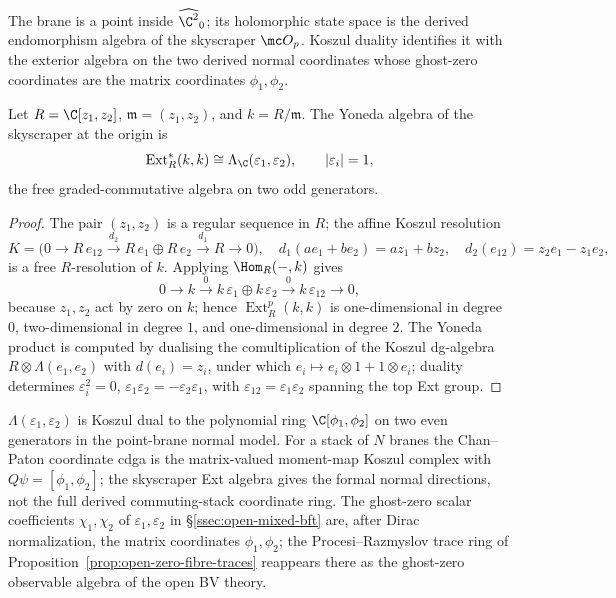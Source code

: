 \documentclass[11pt]{memoir}
\begin{document}
The brane is a point inside \(\widehat{\C^2}_0\); its holomorphic
state space is the derived endomorphism algebra of the skyscraper
\(\mc O_p\). Koszul duality identifies it with the exterior algebra
on the two derived normal coordinates whose ghost-zero coordinates are
the matrix coordinates \(\phi_1,\phi_2\).

\begin{prop}\label{prop:skyscraper-ext}
  Let \(R=\C[z_1,z_2]\), \(\mathfrak m=(z_1,z_2)\), and
  \(k=R/\mathfrak m\). The Yoneda algebra of the skyscraper at the
  origin is
  \[
    \operatorname{Ext}^*_R(k,k)\cong
      \Lambda_{\C}(\varepsilon_1,\varepsilon_2),\qquad
    |\varepsilon_i|=1,
  \]
  the free graded-commutative algebra on two odd generators.
\end{prop}

\begin{proof}
  The pair \((z_1,z_2)\) is a regular sequence in \(R\); the affine
  Koszul resolution
  \[
    K=\bigl(0\to R\,e_{12}\xrightarrow{d_2}
      R\,e_1\oplus R\,e_2\xrightarrow{d_1}R\to0\bigr),\quad
    d_1(ae_1+be_2)=az_1+bz_2,\quad
    d_2(e_{12})=z_2e_1-z_1e_2,
  \]
  is a free \(R\)-resolution of \(k\). Applying \(\Hom_R(-,k)\) gives
  \[
    0\to k\xrightarrow{0}k\,\varepsilon_1\oplus k\,\varepsilon_2
      \xrightarrow{0}k\,\varepsilon_{12}\to 0,
  \]
  because \(z_1,z_2\) act by zero on \(k\); hence
  \(\operatorname{Ext}^p_R(k,k)\) is one-dimensional in degree \(0\),
  two-dimensional in degree \(1\), and one-dimensional in degree
  \(2\). The Yoneda product is computed by dualising the
  comultiplication of the Koszul dg-algebra
  \(R\otimes\Lambda(e_1,e_2)\) with \(d(e_i)=z_i\), under which
  \(e_i\mapsto e_i\otimes1+1\otimes e_i\); duality determines
  \(\varepsilon_i^2=0\),
  \(\varepsilon_1\varepsilon_2=-\varepsilon_2\varepsilon_1\), with
  \(\varepsilon_{12}=\varepsilon_1\varepsilon_2\) spanning the top Ext
  group.
\end{proof}

\begin{rmk}\label{rmk:open-koszul-duality}
  \(\Lambda(\varepsilon_1,\varepsilon_2)\) is Koszul dual to the
  polynomial ring \(\C[\phi_1,\phi_2]\) on two even generators in the
  point-brane normal model.  For a stack of \(N\) branes the
  Chan--Paton coordinate cdga is the matrix-valued moment-map Koszul
  complex with \(Q\psi=[\phi_1,\phi_2]\); the skyscraper Ext algebra
  gives the formal normal directions, not the full derived
  commuting-stack coordinate ring.  The ghost-zero scalar coefficients
  \(\chi_1,\chi_2\) of \(\varepsilon_1,\varepsilon_2\)
  in \S\ref{ssec:open-mixed-bft} are, after Dirac normalization, the
  matrix coordinates \(\phi_1,\phi_2\); the Procesi--Razmyslov trace
  ring of Proposition~\ref{prop:open-zero-fibre-traces} reappears
  there as the ghost-zero observable algebra of the open BV theory.
\end{rmk}
\end{document}
